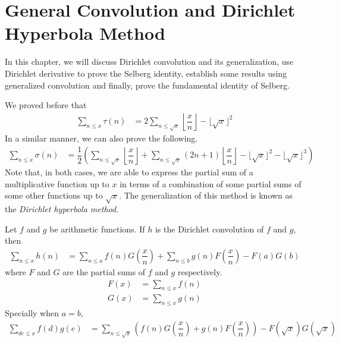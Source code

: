 \documentclass[elemannt.tex]{subfile}
\begin{document}
    \section{General Convolution and Dirichlet Hyperbola Method}
    In this chapter, we will discuss Dirichlet convolution and its generalization, use Dirichlet derivative to prove the Selberg identity, establish some results using generalized convolution and finally, prove the fundamental identity of Selberg.
    
    We proved before that
    	\begin{align*}
    		\sum\limits_{n\leq x}\tau(n)
    			& = 2\sum\limits_{n\leq \sqrt{x}}\left\lfloor{\dfrac{x}{n}}\right\rfloor-\lfloor{\sqrt{x}}\rfloor^{2}
    	\end{align*}
    In a similar manner, we can also prove the following.
    	\begin{align*}
    		\sum\limits_{n\leq x}\sigma(n)
    			& = \dfrac{1}{2}\left(\sum\limits_{n\leq \sqrt{x}}\left\lfloor{\dfrac{x}{n}}\right\rfloor+\sum\limits_{n\leq \sqrt{x}}(2n+1)\left\lfloor{\dfrac{x}{n}}\right\rfloor-\lfloor{\sqrt{x}}\rfloor^{2}-\lfloor{\sqrt{x}}\rfloor^{3}\right)
    	\end{align*}
    Note that, in both cases, we are able to express the partial sum of a multiplicative function up to $x$ in terms of a combination of some partial sums of some other functions up to $\sqrt{x}$. The generalization of this method is known as the \textit{Dirichlet hyperbola method}.
    	\begin{theorem}\label{thm:hyperbola}
    		Let $f$ and $g$ be arithmetic functions. If $h$ is the Dirichlet convolution of $f$ and $g$, then
    			\begin{align*}
    				\sum\limits_{n\leq x}h(n)
    					& = \sum\limits_{n\leq a}f(n)G\left(\dfrac{x}{n}\right)+\sum\limits_{n\leq b}g(n)F\left(\dfrac{x}{n}\right)-F(a)G(b)
    			\end{align*}
    		where $F$ and $G$ are the partial sums of $f$ and $g$ respectively.
    			\begin{align*}
    				F(x)
    					& = \sum\limits_{n\leq x}f(n)\\
    				G(x)
    					& = \sum\limits_{n\leq x}g(n)
    			\end{align*}
    		Specially when $a=b$,
    			\begin{align*}
    				\sum\limits_{de\leq x}f(d)g(e)
    					& = \sum\limits_{n\leq \sqrt{x}}\left(f(n)G\left(\dfrac{x}{n}\right)+g(n)F\left(\dfrac{x}{n}\right)\right)-F(\sqrt{x})G(\sqrt{x})
    			\end{align*}
    	\end{theorem}
\end{document}
